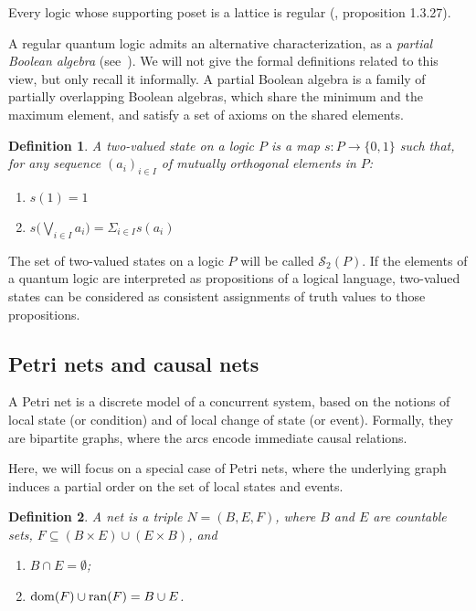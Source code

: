 \documentclass{eptcs}
\newcommand{\dom}{\mathop{\rm dom}\nolimits}   \newcommand{\ran}{\mathop{\rm ran}\nolimits}   \newcommand{\Atoms}{\mathop{\rm Atoms}\nolimits}
\newtheorem{definition}{Definition}
\begin{document}
Every logic whose supporting poset is a lattice is regular
(\cite{PP91}, proposition 1.3.27).

A regular quantum logic admits an alternative characterization,
as a \emph{partial Boolean algebra} (see~\cite{H89}).
We will not give the formal definitions related to this view,
but only recall it informally.
A partial Boolean algebra is a family of partially overlapping
Boolean algebras, which share the minimum and the maximum
element, and satisfy a set of axioms on the shared elements.

\begin{definition} \cite{PP91}
A \emph{two-valued state} on a logic $P$ is a map
$s:P \rightarrow \{0, 1\}$
such that, for any sequence $(a_i)_{i \in I}$
of mutually orthogonal elements in $P$:
\begin{enumerate}
  \item $s(1) = 1$
  \item $s\big(\bigvee_{i\in I} a_i\big) = \Sigma_{i\in I}s(a_i)$
\end{enumerate}
\end{definition}

The set of two-valued states on a logic $P$ will be called
$\mathcal{S}_2(P)$.
If the elements of a quantum logic are interpreted as propositions
of a logical language, two-valued states can be considered as
consistent assignments of truth values to those propositions.
\subsection{Petri nets and causal nets}\label{s:nets}
A Petri net is a discrete model of a concurrent system, based on
the notions of local state (or condition) and of local change of
state (or event). Formally, they are bipartite graphs, where the
arcs encode immediate causal relations.

Here, we will focus on a special case of Petri nets, where the
underlying graph induces a partial order on the set of local states
and events.
\begin{definition} \label{d:net}
  A \emph{net} is a triple $ N = (B, E, F) $, where
  $B$ and $E$ are countable sets,
  $ F \subseteq ( B \times E ) \cup ( E \times B) $, and
  \begin{enumerate}
    \item $ B \cap E = \emptyset $;
    \item $ \dom(F) \cup \ran(F) =  B \cup E$.
  \end{enumerate}
\end{definition}
\end{document}

